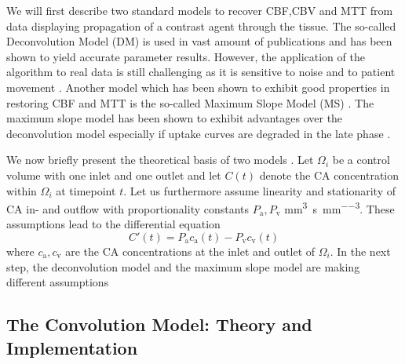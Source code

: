 \documentclass[paper=a4, fontsize=11pt,parskip=half,headings=small]{scrartcl}
\newcommand{\ca}{c_\mathrm{a}}
\newcommand{\cout}{c_{\mathrm{v}}}
\newcommand{\Pa}{P_{\mathrm{a}}}
\newcommand{\Pout}{P_{\mathrm{v}}}
\newcommand{\siP}{\cubic\milli\meter\per\second\per\cubic\milli\meter}
\begin{document}
	We will first describe two standard models to recover CBF,CBV and MTT from data displaying propagation of a contrast agent through the tissue.
	The so-called Deconvolution Model (DM) is used in vast amount of publications \cite{ostergaard96,abels10,straka10,bivard13,sourbron13} and has been shown to yield accurate parameter results.
	However, the application of the algorithm to real data is still challenging as it is sensitive to noise and to patient movement \cite{kudo10}.
	Another model which has been shown to exhibit good properties in restoring CBF and MTT is the so-called Maximum Slope Model (MS) \cite{miles91,klotz99}.
	The maximum slope model has been shown to exhibit advantages over the deconvolution model especially if uptake curves are degraded in the late phase \cite{abels10}.
		
	We now briefly present the theoretical basis of two models \cite{sourbron13}.
	Let $\Omega_i$ be a control volume with one inlet and one outlet and let $C(t)$ denote the CA concentration within $\Omega_i$ at timepoint $t$.
	Let us furthermore assume linearity and stationarity of CA in- and outflow with proportionality constants $\Pa,\Pout$ \si{\siP}.
	These assumptions lead to the differential equation 
	\begin{equation}
		C'(t) = \Pa\ca(t) - \Pout\cout(t)
		\label{eq:classicgeneral}
	\end{equation}
	where $\ca,\cout$ are the CA concentrations at the inlet and outlet of $\Omega_i$. 	
	In the next step, the deconvolution model and the maximum slope model are making different assumptions

	\subsection{The Convolution Model: Theory and Implementation}\label{sec:conv}
	
\end{document}
